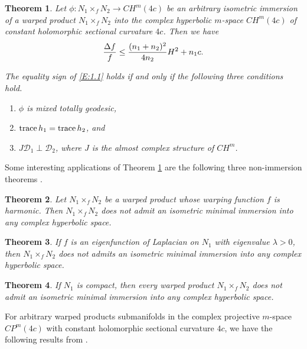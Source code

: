\documentclass{amsart}
\theoremstyle{plain}
\newtheorem{theorem}{Theorem}[section]
\numberwithin{equation}{section}
\theoremstyle{remark}
\numberwithin{equation}{section}
\begin{document}
\begin{theorem}\label{T:5.1} Let $\phi:N_1\times_f N_2\to CH^m(4c)$ be an arbitrary isometric immersion of a warped product $N_1\times_f N_2$ into the complex hyperbolic $m$-space $CH^m(4c)$ of constant holomorphic sectional curvature $4c$. Then we have
\begin{align} \label{E:1.1} {\Delta f\over {f}}\leq {{(n_1+n_2)^2}\over{4n_2}}H^2+ n_1c. \end{align} 

The equality sign of \eqref{E:1.1} holds if and only if the following three conditions hold.
\begin{enumerate}

\item  $\phi$ is mixed totally geodesic, 

\item ${\rm trace}\,h_1= {\rm trace}\,h_2$, and

\item $J{\mathcal D_1}\perp {\mathcal D_2}$, where $J$ is the almost complex structure of $CH^m$.
\end{enumerate}\end{theorem}

Some interesting applications of Theorem \ref{T:5.1} are the following three non-immersion theorems  \cite{c02-4}.

\begin{theorem}\label{T:5.2} Let $N_1\times_f N_2$ be a warped product whose warping function $f$ is  harmonic. Then  $N_1\times_f N_2$ does not admit an isometric minimal immersion into any complex hyperbolic space.
 \end{theorem}

\begin{theorem}\label{T:5.3} If $f$ is an eigenfunction of Laplacian on $N_1$ with eigenvalue $\lambda>0$, then  $N_1\times_f N_2$ does not admits an isometric minimal immersion into any complex hyperbolic space.
\end{theorem}

\begin{theorem}\label{T:5.4}If $N_1$ is compact, then every warped product $N_1\times_f N_2$ does not admit an isometric minimal immersion into any complex hyperbolic space.
\end{theorem}

For arbitrary  warped products submanifolds in the complex projective $m$-space $CP^{m}(4c)$ with constant holomorphic sectional curvature $4c$, we have the following results from \cite{c03-2}.
\end{document}
